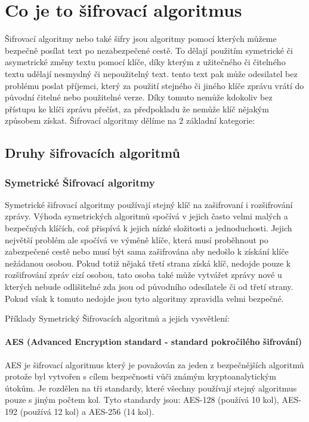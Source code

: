 \documentclass[12pt,a4paper]{report}
\begin{document}
\chapter{Co je to šifrovací algoritmus}
Šifrovací algoritmy nebo také šifry jsou algoritmy pomocí kterých můžeme bezpečně posílat text po nezabezpečené cestě. To dělají použitím symetrické či asymetrické změny textu pomocí klíče, díky kterým z užitečného či čitelného textu udělají nesmyslný či nepoužitelný text. tento text pak může odesilatel bez problému poslat příjemci, který za použití stejného či jiného klíče zprávu vrátí do původní čitelné nebo použitelné verze. Díky tomuto nemůže kdokoliv bez přístupu ke klíči zprávu přečíst, za předpokladu že nemůže klíč nějakým způsobem získat. Šifrovací algoritmy dělíme na 2 základní kategorie:
\section{Druhy šifrovacích algoritmů}


\subsection{Symetrické Šifrovací algoritmy}
Symetrické šifrovací algoritmy používají stejný klíč na zašifrovaní i rozšifrování zprávy. Výhoda symetrických algoritmů spočívá v jejich často velmi malých a bezpečných klíčích, což přispívá k jejich nízké složitosti a jednoduchosti. Jejich největší problém ale spočívá ve výměně klíče, která musí proběhnout po zabezpečené cestě nebo musí být sama zašifrována aby nedošlo k získání klíče nežádanou osobou. Pokud totiž nějaká třetí strana získá klíč, nedojde pouze k rozšifrování zpráv cizí osobou, tato osoba také může vytvářet zprávy nové u kterých nebude odlišitelné zda jsou od původního odesílatele či od třetí strany. Pokud však k tomuto nedojde jsou tyto algoritmy zpravidla velmi bezpečné.

Příklady Symetrický Šifrovacích algoritmů a jejich vysvětlení:

\subsubsection {AES (Advanced Encryption standard - standard pokročilého šifrování)}
AES je šifrovací algoritmus který je považován za jeden z bezpečnějších algoritmů protože byl vytvořen s cílem bezpečnosti vůči známým kryptoanalytickým útokům. Je rozdělen na tři standardy, které všechny používají stejný algoritmus pouze s jiným počtem kol. Tyto standardy jsou: AES-128 (používá 10 kol), AES-192 (používá 12 kol) a AES-256 (14 kol).
\end{document}

